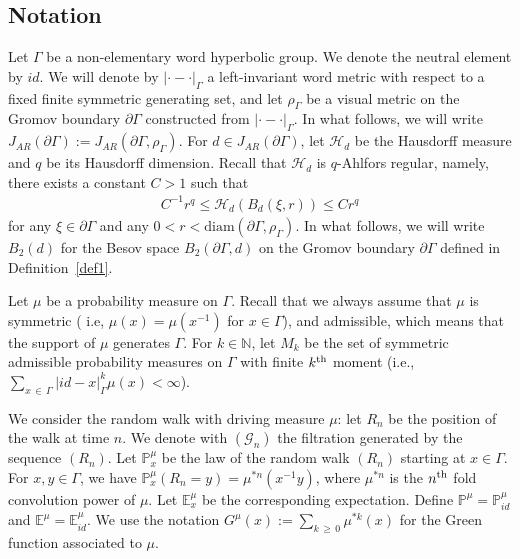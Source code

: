 \documentclass[10pt]{amsart}
\theoremstyle{definition}\newtheorem{defi}[theo]{Definition}\newtheorem{rema}[theo]{Remark}\newtheorem{exam}[theo]{Example}\newtheorem{exem}[theo]{Example}\newtheorem{nota}[theo]{Notation}
\newcommand{\ch}{\mathcal{H}}
\newcommand{\cG}{\mathcal{G}}
\newcommand{\bp}{\mathbb{P}}
\newcommand{\bn}{\mathbb{N}}
\newcommand{\be}{\mathbb{E}}
\newcommand{\diam}{\mathrm{diam}}
\begin{document}
\subsection*{Notation}

Let $\Gamma$ be a non-elementary word hyperbolic group. We denote the neutral element by ${id}$. We will denote by $|\cdot-\cdot|_{\Gamma}$ a left-invariant word metric with respect to a fixed finite symmetric generating set, and let $\rho_{\Gamma}$ be a visual metric on the Gromov boundary $\partial \Gamma$ constructed from $|\cdot-\cdot|_{\Gamma}$. In what follows, we will write $J_{AR}(\partial\Gamma):=J_{AR}(\partial\Gamma,\rho_{\Gamma})$. For $d\in J_{AR}(\partial\Gamma)$, let $\ch_{d}$ be the Hausdorff measure and $q$ be its Hausdorff dimension. Recall that $\ch_{d}$ is $q$-Ahlfors regular, namely, there exists a constant $C>1$ such that
\begin{align*}
C^{-1}r^q \leq\ch_{d}(B_{d}(\xi,r))\leq Cr^{q}
\end{align*}
for any $\xi\in\partial\Gamma$ and any $0<r<\diam(\partial\Gamma,\rho_{\Gamma})$. In what follows, we will write $B_2(d)$ for the Besov space $B_2(\partial\Gamma,d)$ on the Gromov boundary $\partial\Gamma$ defined in Definition~\ref{def1}.

Let $\mu$ be a probability measure on $\Gamma$. Recall that we always assume that $\mu$ is symmetric ( i.e, $\mu(x)=\mu(x^{-1})$ for $x\in\Gamma$), and admissible, which means that the support of $\mu$ generates $\Gamma$. For $k\in\bn$, let $M_k$ be the set of symmetric admissible probability measures on $\Gamma$ with finite $k^{\rm th}$ moment (i.e., $\sum_{x\,\in\,\Gamma}|id-x|_{\Gamma}^k\mu(x)<\infty$).


We consider the random walk with driving measure $\mu$: let $R_n$ be the position of the walk at time $n$. We denote with $(\cG_n)$ the filtration generated by the sequence $(R_n)$. Let $\bp_x^{\mu}$ be the law of the random walk $(R_n)$ starting at $x\in\Gamma$. For $x,y\in\Gamma$, we have $\bp_x^{\mu}(R_n=y)=\mu^{*n}(x^{-1}y)$, where $\mu^{*n}$ is the $n^{\rm th}$ fold convolution power of $\mu$. Let $\be_x^\mu$ be the corresponding expectation. Define $\bp^{\mu}=\bp^{\mu}_{id}$ and $\be^\mu=\be^\mu_{id}$. We use the notation $G^{\mu}(x):=\sum_{k\,\geq\,0}\mu^{*k}(x)$ for the Green function associated to $\mu$.
\end{document}
